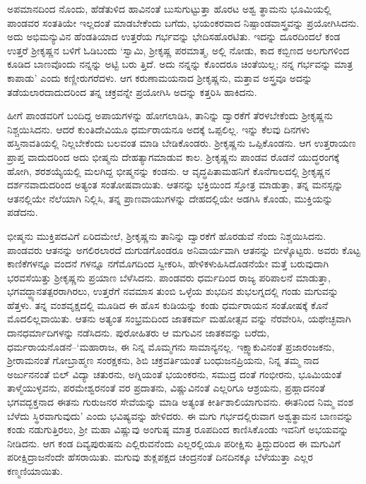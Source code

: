 ಅಪಮಾನದಿಂದ ನೊಂದು, ಹೆಡೆತುಳಿದ ಹಾವಿನಂತೆ ಬುಸುಗುಟ್ಟುತ್ತಾ ಹೊರಟ ಅಶ್ವ ತ್ಥಾಮನು ಭೂಮಿಯಲ್ಲಿ ಪಾಂಡವರ ಸಂತತಿಯೇ ಇಲ್ಲದಂತೆ ಮಾಡಬೇಕೆಂದು ಬಗೆದು, ಭಯಂಕರವಾದ ನಿಷ್ಪಾಂಡವಾಸ್ತ್ರವನ್ನು ಪ್ರಯೋಗಿಸಿದನು. ಅದು ಅಭಿಮನ್ಯುವಿನ ಹೆಂಡತಿಯಾದ ಉತ್ತರೆಯ ಗರ್ಭವನ್ನು ಭೇದಿಸಹೊರಟಿತು. ಇದನ್ನು ದೂರದಿಂದಲೆ ಕಂಡ ಉತ್ತರೆ ಶ್ರೀಕೃಷ್ಣನ ಬಳಿಗೆ ಓಡಿಬಂದು ‘ಸ್ವಾಮಿ, ಶ್ರೀಕೃಷ್ಣ ಪರಮಾತ್ಮ, ಅಲ್ಲಿ ನೋಡು, ಕಾದ ಕಬ್ಬಿಣದ ಅಲಗುಗಳಿಂದ ಕೂಡಿದ ಬಾಣವೊಂದು ನನ್ನನ್ನು ಅಟ್ಟಿ ಬರು ತ್ತಿದೆ. ಅದು ನನ್ನನ್ನು ಕೊಂದರೂ ಚಿಂತೆಯಿಲ್ಲ; ನನ್ನ ಗರ್ಭವನ್ನು ಮಾತ್ರ ಕಾಪಾಡು’ ಎಂದು ಕಣ್ಣೀರುಗರೆದಳು. ಆಗ ಕರುಣಾಮಯನಾದ ಶ್ರೀಕೃಷ್ಣನು, ಮತ್ತಾವ ಅಸ್ತ್ರವೂ ಅದನ್ನು ತಡೆಯಲಾರದಾದುದರಿಂದ ತನ್ನ ಚಕ್ರವನ್ನೇ ಪ್ರಯೋಗಿಸಿ ಅದನ್ನು ಕತ್ತರಿಸಿ ಹಾಕಿದನು.

ಹೀಗೆ ಪಾಂಡವರಿಗೆ ಬಂದಿದ್ದ ಅಪಾಯಗಳನ್ನು ಹೋಗಲಾಡಿಸಿ, ತಾನಿನ್ನು ದ್ವಾರಕೆಗೆ ತೆರಳಬೇಕೆಂದು ಶ್ರೀಕೃಷ್ಣನು ನಿಶ್ಚಯಿಸಿದನು. ಆದರೆ ಕುಂತಿದೇವಿಯೂ ಧರ್ಮರಾಯನೂ ಅದಕ್ಕೆ ಒಪ್ಪಲಿಲ್ಲ. ಇನ್ನು ಕೆಲವು ದಿನಗಳು ಹಸ್ತಿನಾವತಿಯಲ್ಲಿ ನಿಲ್ಲಬೇಕೆಂದು ಬಲವಂತ ಮಾಡಿ ಬೇಡಿಕೊಂಡರು. ಶ್ರೀಕೃಷ್ಣನು ಒಪ್ಪಿಕೊಂಡನು. ಆಗ ಉತ್ತರಾಯಣ ಪ್ರಾಪ್ತ ವಾದುದರಿಂದ ಅದು ಭೀಷ್ಮನು ದೇಹತ್ಯಾಗಮಾಡುವ ಕಾಲ. ಶ್ರೀಕೃಷ್ಣನು ಪಾಂಡವ ರೊಡನೆ ಯುದ್ಧರಂಗಕ್ಕೆ ಹೋಗಿ, ಶರಶಯ್ಯೆಯಲ್ಲಿ ಮಲಗಿದ್ದ ಭೀಷ್ಮನನ್ನು ಕಂಡನು. ಆ ವೃದ್ಧಪಿತಾಮಹನಿಗೆ ಕೊನೆಗಾಲದಲ್ಲಿ ಶ್ರೀಕೃಷ್ಣನ ದರ್ಶನವಾದುದರಿಂದ ಅತ್ಯಂತ ಸಂತೋಷವಾಯಿತು. ಆತನನ್ನು ಭಕ್ತಿಯಿಂದ ಸ್ತೋತ್ರ ಮಾಡುತ್ತಾ, ತನ್ನ ಮನಸ್ಸನ್ನು ಆತನಲ್ಲಿಯೇ ನೆಲೆಯಾಗಿ ನಿಲ್ಲಿಸಿ, ತನ್ನ ಪ್ರಾಣವಾಯುಗಳನ್ನು ದೇಹದಲ್ಲಿಯೇ ಅಡಗಿಸಿ ಕೊಂಡು, ಮುಕ್ತಿಯನ್ನು ಪಡೆದನು.

ಭೀಷ್ಮನು ಮುಕ್ತಿಪದವಿಗೆ ಏರಿದಮೇಲೆ, ಶ್ರೀಕೃಷ್ಣನು ತಾನಿನ್ನು ದ್ವಾರಕೆಗೆ ಹೊರಡುವೆ ನೆಂದು ನಿಶ್ಚಯಿಸಿದನು. ಪಾಂಡವರು ಆತನನ್ನು ಅಗಲಿರಲಾರದೆ ದುಗುಡಗೊಂಡರೂ ಅನಿವಾರ್ಯವಾಗಿ ಆತನನ್ನು ಬೀಳ್ಕೊಟ್ಟರು. ಅವರು ಕೊಟ್ಟ ಕಾಣಿಕೆಗಳನ್ನೂ ವಂದನೆ ಗಳನ್ನೂ ನಗೆಮೊಗದಿಂದ ಸ್ವೀಕರಿಸಿ, ಹೇಳಿಕಳುಹಿಸಿದೊಡನೆಯೇ ಮತ್ತೆ ಬರುವುದಾಗಿ ಭರವಸೆಯಿತ್ತು ಶ್ರೀಕೃಷ್ಣನು ಪ್ರಯಾಣ ಬೆಳೆಸಿದನು. ಪಾಂಡವರು ಧರ್ಮದಿಂದ ರಾಜ್ಯ ಪರಿಪಾಲನೆ ಮಾಡುತ್ತಾ, ಭಗವದ್ಧ್ಯಾನತತ್ಪರರಾಗಿರಲು, ಉತ್ತರೆಗೆ ನವಮಾಸ ತುಂಬಿ ಒಳ್ಳೆಯ ಶುಭದಿನ ಶುಭಲಗ್ನದಲ್ಲಿ ಗಂಡು ಮಗುವನ್ನು ಹೆತ್ತಳು. ತನ್ನ ವಂಶವೃಕ್ಷದಲ್ಲಿ ಮೂಡಿದ ಈ ಹೊಸ ಕುಡಿಯನ್ನು ಕಂಡು ಧರ್ಮರಾಯನ ಸಂತೋಷಕ್ಕೆ ಕೊನೆ ಮೊದಲಿಲ್ಲವಾಯಿತು. ಆತನು ಅತ್ಯಂತ ಸಂಭ್ರಮದಿಂದ ಜಾತಕರ್ಮ ಮಹೋತ್ಸವ ವನ್ನು ನೆರವೇರಿಸಿ, ಯಥೇಚ್ಛವಾಗಿ ದಾನಧರ್ಮಾದಿಗಳನ್ನು ನಡೆಸಿದನು. ಪುರೋಹಿತರು ಆ ಮಗುವಿನ ಜಾತಕವನ್ನು ಬರೆದು, ಧರ್ಮರಾಯನೊಡನೆ–‘ಮಹಾರಾಜ, ಈ ನಿನ್ನ ಮೊಮ್ಮಗನು ಸಾಮಾನ್ಯನಲ್ಲ. ಇಕ್ಷ್ವಾಕುವಿನಂತೆ ಪ್ರಜಾರಂಜಕನು, ಶ್ರೀರಾಮನಂತೆ ಗೋಬ್ರಾಹ್ಮಣ ಸಂರಕ್ಷಕನು, ಶಿಬಿ ಚಕ್ರವರ್ತಿಯಂತೆ ಬಂಧುಜನಪ್ರಿಯನು, ನಿನ್ನ ತಮ್ಮ ನಾದ ಅರ್ಜುನನಂತೆ ಬಿಲ್ ವಿದ್ಯಾ ಚತುರನು, ಅಗ್ನಿಯಂತೆ ಭಯಂಕರನು, ಸಮುದ್ರ ದಂತೆ ಗಂಭೀರನು, ಭೂಮಿಯಂತೆ ತಾಳ್ಮೆಯುಳ್ಳವನು, ಪರಮೇಶ್ವರನಂತೆ ವರ ಪ್ರದಾತನು, ವಿಷ್ಣುವಿನಂತೆ ಎಲ್ಲರಿಗೂ ಆಶ್ರಯನು, ಪ್ರಹ್ಲಾದನಂತೆ ಭಗವದ್ಭಕ್ತನಾದ ಈತನು ಗುರುಜನರ ಸೇವೆಯನ್ನು ಮಾಡಿ ಅತ್ಯಂತ ಕೀರ್ತಿಶಾಲಿಯಾಗುವನು. ಈತನಿಂದ ನಿಮ್ಮ ವಂಶ ಬೆಳೆದು ಸ್ಥಿರವಾಗುವುದು’ ಎಂದು ಭವಿಷ್ಯವನ್ನು ಹೇಳಿದರು. ಈ ಮಗು ಗರ್ಭದಲ್ಲಿರುವಾಗ ಅಶ್ವತ್ಥಾಮನ ಬಾಣವನ್ನು ಕಂಡು ನಡುಗುತ್ತಿರಲು, ಶ್ರೀ ಮಹಾ ವಿಷ್ಣುವು ಅಂಗುಷ್ಠ ಮಾತ್ರ ರೂಪದಿಂದ ಕಾಣಿಸಿಕೊಂಡು ಇವನಿಗೆ ಅಭಯವನ್ನು ನೀಡಿದನು. ಆಗ ಕಂಡ ದಿವ್ಯಪುರುಷನು ಎಲ್ಲಿರುವನೆಂದು ಎಲ್ಲರಲ್ಲಿಯೂ ಪರೀಕ್ಷಿಸು ತ್ತಿದ್ದುದರಿಂದ ಈ ಮಗುವಿಗೆ ಪರೀಕ್ಷಿದ್ರಾಜನೆಂದೇ ಹೆಸರಾಯಿತು. ಮಗುವು ಶುಕ್ಲಪಕ್ಷದ ಚಂದ್ರನಂತೆ ದಿನದಿನಕ್ಕೂ ಬೆಳೆಯುತ್ತಾ ಎಲ್ಲರ ಕಣ್ಮಣಿಯಾಯಿತು.

